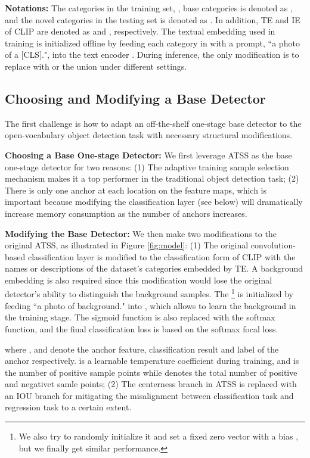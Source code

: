 \documentclass[10pt,twocolumn,letterpaper]{article}
\begin{document}
\noindent \textbf{Notations:} The categories in the training set, \ie, base categories is denoted as , and the novel categories in the testing set is denoted as . In addition, TE and IE of CLIP are denoted as  and , respectively. The textual embedding  used in training is initialized offline by feeding each category in  with a prompt, \ie ``a photo of a [CLS].", into the text encoder . During inference, the only modification is to replace  with  or the union  under different settings.








\subsection{Choosing and Modifying a Base Detector}
\label{sec: base-model}
    The first challenge is how to adapt an off-the-shelf one-stage base detector to the open-vocabulary object detection task with necessary structural modifications. 


\noindent \textbf{Choosing a Base One-stage Detector:} We first leverage ATSS \cite{Zhang_2020_CVPR} as the base one-stage detector for two reasons: (1) The adaptive training sample selection mechanism makes it a top performer in the traditional object detection task; (2) There is only one anchor at each location on the feature maps, which is important because modifying the classification layer (see below) will dramatically increase memory consumption as the number of anchors increases. 

\noindent \textbf{Modifying the Base Detector:} We then make two modifications to the original ATSS, as illustrated in Figure \ref{fig:model}:
(1) The original convolution-based classification layer is modified to the classification form of CLIP with the names or descriptions of the dataset’s categories embedded by TE. A background embedding  is also required since this modification would lose the original detector's ability to distinguish the background samples.  The  \footnote{We also try to randomly initialize it \cite{xie2021zsd} and set a fixed zero vector with a bias \cite{zareian2021open}, but we finally get similar performance.} is initialized by feeding ``a photo of background." into , which allows to learn the background in the training stage. The sigmoid function is also replaced with the softmax function, and the final classification loss is based on the softmax focal loss.  

where ,  and  denote the anchor feature, classification result and label of the anchor respectively.  is a learnable temperature coefficient during training, and  is the number of positive sample points while  denotes the total number of positive and negativet samle points;
(2) The centerness branch in ATSS is replaced with an IOU branch \cite{paa-eccv2020} for mitigating the misalignment between classification task and regression task to a certain extent.  
\end{document}
